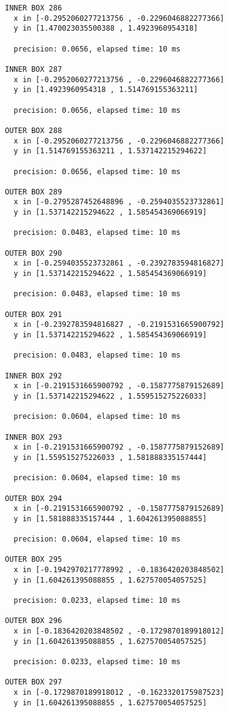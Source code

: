 \begin{verbatim}
INNER BOX 286
  x in [-0.2952060277213756 , -0.2296046882277366]
  y in [1.470023035500388 , 1.4923960954318]

  precision: 0.0656, elapsed time: 10 ms

INNER BOX 287
  x in [-0.2952060277213756 , -0.2296046882277366]
  y in [1.4923960954318 , 1.514769155363211]

  precision: 0.0656, elapsed time: 10 ms

OUTER BOX 288
  x in [-0.2952060277213756 , -0.2296046882277366]
  y in [1.514769155363211 , 1.537142215294622]

  precision: 0.0656, elapsed time: 10 ms

OUTER BOX 289
  x in [-0.2795287452648896 , -0.2594035523732861]
  y in [1.537142215294622 , 1.585454369066919]

  precision: 0.0483, elapsed time: 10 ms

OUTER BOX 290
  x in [-0.2594035523732861 , -0.2392783594816827]
  y in [1.537142215294622 , 1.585454369066919]

  precision: 0.0483, elapsed time: 10 ms

OUTER BOX 291
  x in [-0.2392783594816827 , -0.2191531665900792]
  y in [1.537142215294622 , 1.585454369066919]

  precision: 0.0483, elapsed time: 10 ms

INNER BOX 292
  x in [-0.2191531665900792 , -0.1587775879152689]
  y in [1.537142215294622 , 1.559515275226033]

  precision: 0.0604, elapsed time: 10 ms

INNER BOX 293
  x in [-0.2191531665900792 , -0.1587775879152689]
  y in [1.559515275226033 , 1.581888335157444]

  precision: 0.0604, elapsed time: 10 ms

OUTER BOX 294
  x in [-0.2191531665900792 , -0.1587775879152689]
  y in [1.581888335157444 , 1.604261395088855]

  precision: 0.0604, elapsed time: 10 ms

OUTER BOX 295
  x in [-0.1942970217778992 , -0.1836420203848502]
  y in [1.604261395088855 , 1.627570054057525]

  precision: 0.0233, elapsed time: 10 ms

OUTER BOX 296
  x in [-0.1836420203848502 , -0.1729870189918012]
  y in [1.604261395088855 , 1.627570054057525]

  precision: 0.0233, elapsed time: 10 ms

OUTER BOX 297
  x in [-0.1729870189918012 , -0.1623320175987523]
  y in [1.604261395088855 , 1.627570054057525]


\end{verbatim}
